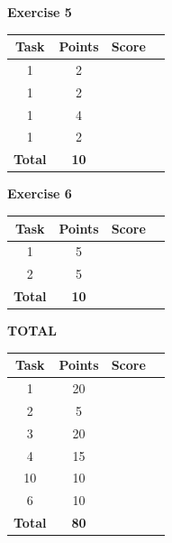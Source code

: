 \documentclass [11pt, a4wide, twoside]{article}
\begin{document}
\noindent
\begin{minipage}[t]{120pt}

\vspace{1cm}

\textbf{Exercise 5}
\vspace{5pt}\\
\begin{tabular}{|c|c|c|c|}
\hline
Task & Points & Score \\\hline
1 & 2 & \\\hline
1 & 2 & \\\hline
1 & 4 & \\\hline
1 & 2 & \\\hline
\textbf{Total} & \textbf{10} &\\\hline\hline
\end{tabular}
\end{minipage}
\begin{minipage}[t]{120pt}
\vspace{1cm}

\textbf{Exercise 6}
\vspace{5pt}\\
\begin{tabular}{|c|c|c|c|}
\hline
Task & Points & Score \\\hline
1 & 5 & \\\hline
2 & 5 & \\\hline
\textbf{Total} & \textbf{10} &\\\hline\hline
\end{tabular}
\vspace{5cm}

\textbf{TOTAL}
\vspace{5pt}\\
\begin{tabular}{|c|c|c|c|}
\hline
Task & Points & Score \\\hline
1 & 20 & \\\hline
2 & 5 & \\\hline
3 & 20 & \\\hline
4 & 15 & \\\hline
10 & 10 & \\\hline
6 & 10 & \\\hline
\textbf{Total} & \textbf{80} &\\\hline\hline
\end{tabular}
\end{minipage}
\end{document}

